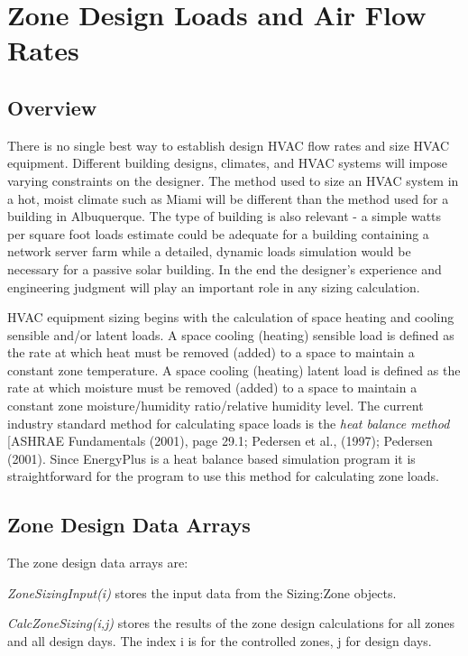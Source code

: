 \section{Zone Design Loads and Air Flow Rates}\label{zone-design-loads-and-air-flow-rates}

\subsection{Overview}\label{overview-030}

There is no single best way to establish design HVAC flow rates and size HVAC equipment. Different building designs, climates, and HVAC systems will impose varying constraints on the designer. The method used to size an HVAC system in a hot, moist climate such as Miami will be different than the method used for a building in Albuquerque. The type of building is also relevant - a simple watts per square foot loads estimate could be adequate for a building containing a network server farm while a detailed, dynamic loads simulation would be necessary for a passive solar building. In the end the designer's experience and engineering judgment will play an important role in any sizing calculation.

HVAC equipment sizing begins with the calculation of space heating and cooling sensible and/or latent loads. A space cooling (heating) sensible load is defined as the rate at which heat must be removed (added) to a space to maintain a constant zone temperature. A space cooling (heating) latent load is defined as the rate at which moisture must be removed (added) to a space to maintain a constant zone moisture/humidity ratio/relative humidity level. The current industry standard method for calculating space loads is the \emph{heat balance method} {[}ASHRAE Fundamentals (2001), page 29.1; Pedersen et al., (1997); Pedersen (2001). Since EnergyPlus is a heat balance based simulation program it is straightforward for the program to use this method for calculating zone loads.

\subsection{Zone Design Data Arrays}\label{zone-design-data-arrays}

The zone design data arrays are:

\emph{ZoneSizingInput(i)} stores the input data from the Sizing:Zone objects.

\emph{CalcZoneSizing(i,j)} stores the results of the zone design calculations for all zones and all design days. The index i is for the controlled zones, j for design days.

